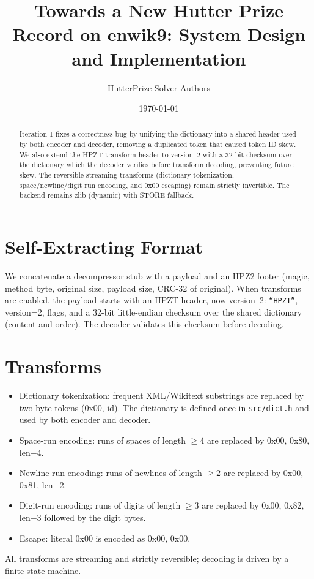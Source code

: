 \documentclass[11pt]{article}
\title{Towards a New Hutter Prize Record on enwik9: System Design and Implementation}
\author{HutterPrize Solver Authors}
\date{\today}
\begin{document}
\maketitle
\begin{abstract}
Iteration 1 fixes a correctness bug by unifying the dictionary into a shared header used by both encoder and decoder, removing a duplicated token that caused token ID skew. We also extend the HPZT transform header to version~2 with a 32-bit checksum over the dictionary which the decoder verifies before transform decoding, preventing future skew. The reversible streaming transforms (dictionary tokenization, space/newline/digit run encoding, and 0x00 escaping) remain strictly invertible. The backend remains zlib (dynamic) with STORE fallback.
\end{abstract}

\section{Self-Extracting Format}
We concatenate a decompressor stub with a payload and an HPZ2 footer (magic, method byte, original size, payload size, CRC-32 of original). When transforms are enabled, the payload starts with an HPZT header, now version~2: \texttt{``HPZT''}, version=2, flags, and a 32-bit little-endian checksum over the shared dictionary (content and order). The decoder validates this checksum before decoding.

\section{Transforms}
\begin{itemize}[noitemsep]
  \item Dictionary tokenization: frequent XML/Wikitext substrings are replaced by two-byte tokens (0x00, id). The dictionary is defined once in \texttt{src/dict.h} and used by both encoder and decoder.
  \item Space-run encoding: runs of spaces of length $\ge 4$ are replaced by 0x00, 0x80, len$-$4.
  \item Newline-run encoding: runs of newlines of length $\ge 2$ are replaced by 0x00, 0x81, len$-$2.
  \item Digit-run encoding: runs of digits of length $\ge 3$ are replaced by 0x00, 0x82, len$-$3 followed by the digit bytes.
  \item Escape: literal 0x00 is encoded as 0x00, 0x00.
\end{itemize}
All transforms are streaming and strictly reversible; decoding is driven by a finite-state machine.
\end{document}
